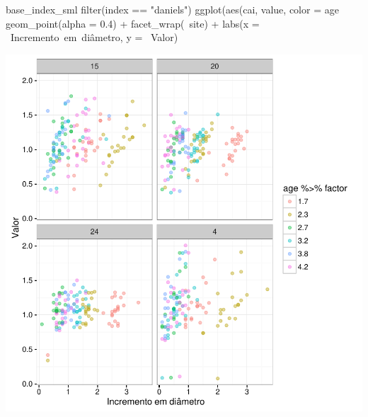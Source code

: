 \documentclass[article]{jss}
\begin{document}
\begin{CodeChunk}
\begin{CodeInput}
base_index_sml %
  filter(index == "daniels") %
  ggplot(aes(cai, value, color = age %
    geom_point(alpha = 0.4) +
    facet_wrap(~site) +
    labs(x = ~Incremento~em~diâmetro, y = ~Valor)
\end{CodeInput}


\begin{center}\includegraphics{comp3-paper_files/figure-latex/disp_daniels-1} \end{center}

\end{CodeChunk}
\end{document}
